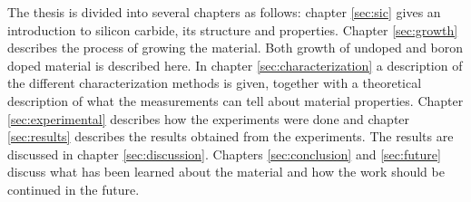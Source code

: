 The thesis is divided into several chapters as follows: chapter \ref{sec:sic} gives an introduction to silicon carbide, its structure and properties. Chapter \ref{sec:growth} describes the process of growing the material. Both growth of undoped and boron doped material is described here. In chapter \ref{sec:characterization} a description of the different characterization methods is given, together with a theoretical description of what the measurements can tell about material properties. Chapter \ref{sec:experimental} describes how the experiments were done and chapter \ref{sec:results} describes the results obtained from the experiments. The results are discussed in chapter \ref{sec:discussion}. Chapters \ref{sec:conclusion} and \ref{sec:future} discuss what has been learned about the material and how the work should be continued in the future. 



































